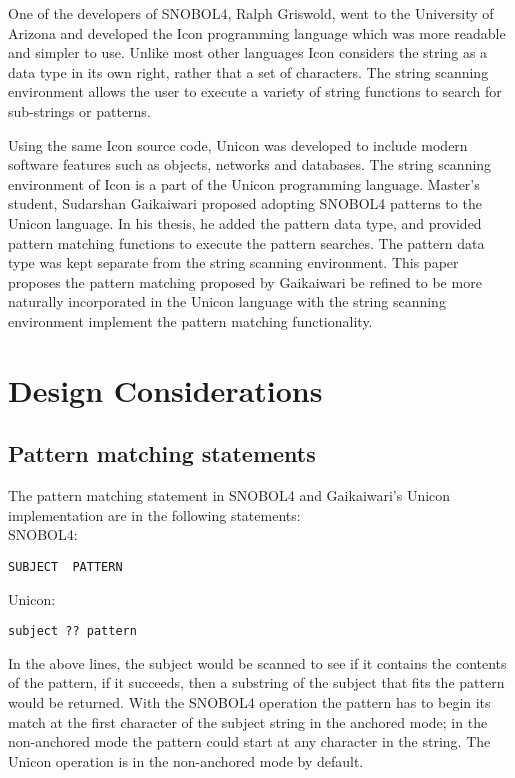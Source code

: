 \documentclass{article}
\begin{document}
One of the developers of SNOBOL4, Ralph Griswold, went to the University of Arizona and developed the Icon programming language which was more readable and simpler to use.\cite{JefferyUnicon}  Unlike most other languages Icon considers the string as a data type in its own right, rather that a set of characters. \cite{GriswoldIcon}  The string scanning environment allows the user to execute a variety of string functions to search for sub-strings or patterns.

Using the same Icon source code, Unicon was developed to include modern software features such as objects, networks and databases. \cite{JefferyUnicon} The string scanning environment of Icon is a part of the Unicon programming language.  Master's student, Sudarshan Gaikaiwari proposed adopting SNOBOL4 patterns to the Unicon language.  In his thesis, he added the pattern data type, and provided pattern matching functions to execute the pattern searches.\cite{Gaikaiwari2005}  The pattern data type was kept separate from the string scanning environment.  This paper proposes the pattern matching proposed by Gaikaiwari be refined to be more naturally incorporated in the Unicon language with the string scanning environment implement the pattern matching functionality.

\section{Design Considerations}



\subsection{Pattern matching statements}
The pattern matching statement in SNOBOL4 and Gaikaiwari's Unicon implementation are in the following statements:\\

\noindent
SNOBOL4:
\begin{verbatim}
SUBJECT  PATTERN
\end{verbatim}
\noindent
Unicon:
\begin{verbatim}
subject ?? pattern
\end{verbatim}

In the above lines, the subject would be scanned to see if it contains the contents of the pattern, if it succeeds, then a substring of the subject that fits the pattern would be returned.  With the SNOBOL4 operation the pattern has to begin its match at the first character of the subject string in the anchored mode; in the non-anchored mode the pattern could start at any character in the string. \cite{Snobol}  The Unicon operation is in the non-anchored mode by default. \cite{Gaikaiwari2005}
\end{document}
